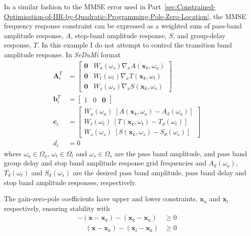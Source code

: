 \documentclass[a4paper,twoside,10pt,english]{report}
\begin{document}
In a similar fashion to the MMSE error used in 
Part~\ref{sec:Constrained-Optimisation-of-IIR-by-Quadratic-Programming-Pole-Zero-Location},
the MMSE frequency response constraint can be expressed as a weighted sum of 
pass-band amplitude response, $A$, stop-band amplitude response, $S$, and 
group-delay response, $T$. In this example I do not attempt to control the
transition band amplitude response. In \emph{SeDuMi} format
\begin{align*}
\boldsymbol{A}_{i}^{T} &= \left[\begin{array}{cc}
\boldsymbol{0} & W_{a}\left(\omega_{s}\right) 
\nabla_{x}A\left(\boldsymbol{x}_{k},\omega_{a}\right) \\
\boldsymbol{0} & W_{t}\left(\omega_{t}\right) 
\nabla_{x}T\left(\boldsymbol{x}_{k},\omega_{t}\right) \\
\boldsymbol{0} & W_{s}\left(\omega_{s}\right)
\nabla_{x}S\left(\boldsymbol{x}_{k},\omega_{s}\right)
\end{array}\right] \\
\boldsymbol{b}_{i}^{T} &= \left[\begin{array}{ccc} 
1 & 0 & \boldsymbol{0} \end{array}\right] \\
\boldsymbol{c}_{i} &= \left[\begin{array}{c}
W_{a}\left(\omega_{a}\right)\;
\left[A\left(\boldsymbol{x}_{k},\omega_{a}\right)-
A_{d}\left(\omega_{a}\right)\right] \\
 W_{t}\left(\omega_{t}\right)\;
\left[T\left(\boldsymbol{x}_{k},\omega_{t}\right)-
T_{d}\left(\omega_{t}\right)\right]\\
W_{s}\left(\omega_{s}\right)\;
\left[S\left(\boldsymbol{x}_{k},\omega_{s}\right)-
S_{d}\left(\omega_{s}\right)\right]
\end{array}\right]\\
d_{i} &= 0
\end{align*}
where $\omega_{a}\in\Omega_{a}$, $\omega_{t}\in\Omega_{t}$ and 
$\omega_{s}\in\Omega_{s}$ are the pass band amplitude, and pass band group delay
and stop band amplitude response grid frequencies and 
$A_{d}\left(\omega_{a}\right)$, $T_{d}\left(\omega_{t}\right)$ and 
$S_{d}\left(\omega_{s}\right)$ are the desired pass band amplitude, pass band 
delay and stop band amplitude responses, respectively.

The gain-zero-pole coefficients have upper and lower constraints, 
$\boldsymbol{x}_{u}$ and $\boldsymbol{x}_{l}$ respectively, ensuring stability
with
\begin{align*}
- \left( \boldsymbol{x} -    \boldsymbol{x}_{k} \right)  
- \left( \boldsymbol{x}_{k} - \boldsymbol{x}_{u} \right) & \ge 0 \\ 
\phantom{-}\left( \boldsymbol{x} - \boldsymbol{x}_{k} \right) 
- \left( \boldsymbol{x}_{l} - \boldsymbol{x}_{k} \right) & \ge 0 
\end{align*}
\end{document}
